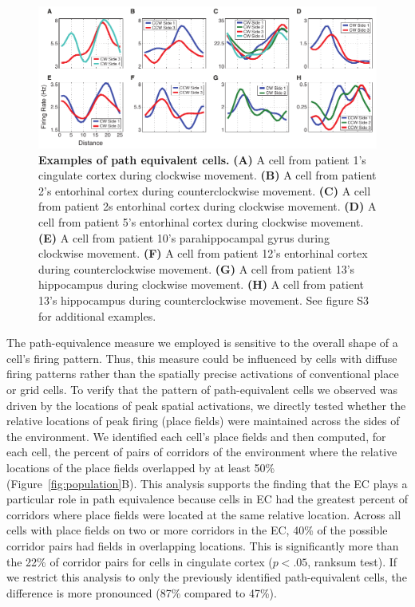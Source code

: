 \begin{figure}
\centering 
\includegraphics[width=.99\textwidth]{./tex/linearGrids/figs/Figure3}
\caption[Examples of path equivalent cells]{\textbf{Examples of path equivalent cells.} \textbf{(A)} A cell from patient 1's cingulate cortex during clockwise movement. \textbf{(B)} A cell from patient 2's entorhinal cortex during counterclockwise movement. \textbf{(C)} A cell from patient 2s entorhinal cortex during clockwise movement. \textbf{(D)} A cell from patient 5's entorhinal cortex during clockwise movement. \textbf{(E)} A cell from patient 10's parahippocampal gyrus during clockwise movement. \textbf{(F)} A cell from patient 12's entorhinal cortex during counterclockwise movement. \textbf{(G)} A cell from patient 13's hippocampus during clockwise movement. \textbf{(H)} A cell from patient 13's hippocampus during counterclockwise movement. See figure S3 for additional examples.} \label{fig:otherExamples}
\end{figure}


The path-equivalence measure we employed is sensitive to the overall shape of a cell's firing pattern.  Thus, this measure could be influenced by cells with diffuse firing patterns \cite{QuirEtal92} rather than the spatially precise activations  of conventional place or grid cells.  To verify that the pattern of path-equivalent cells we observed was driven by the locations of peak spatial activations, we directly tested whether the relative locations of peak firing  (place fields) were maintained across the sides of the environment. We identified each cell's place fields and then computed, for each cell, the percent of pairs of corridors of the environment where the relative locations of the place fields overlapped by at least 50\% (Figure~\ref{fig:population}B).  This analysis supports  the finding that the EC plays a particular role in path equivalence because cells in EC had the greatest percent of corridors where place fields were located at the same relative location. Across all cells with place fields on two or more corridors in the EC, 40\% of the possible corridor pairs had fields in overlapping locations. This is significantly more than the  22\% of corridor pairs for cells in cingulate cortex ($p<.05$, ranksum test). If we restrict this analysis to only the previously identified path-equivalent cells, the difference is more pronounced (87\% compared to 47\%).

